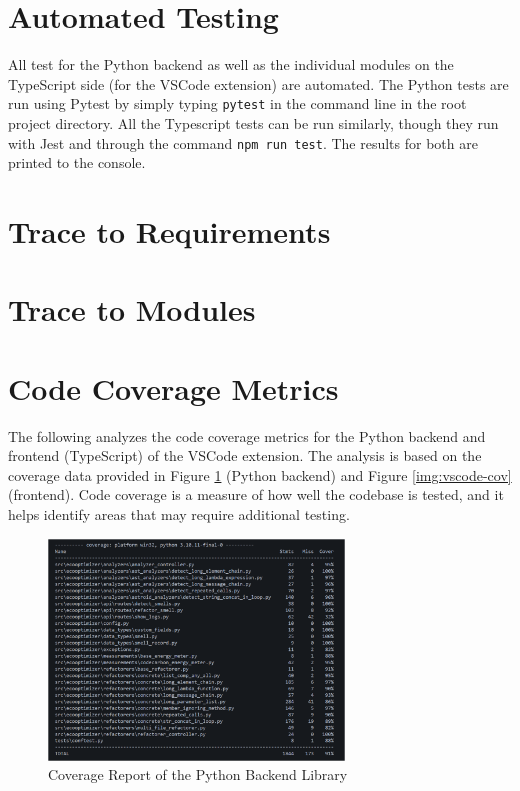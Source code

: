 \documentclass[12pt, titlepage]{article}
\begin{document}

\section{Automated Testing}

All test for the Python backend as well as the individual modules on the TypeScript side (for the VSCode extension) are automated. The Python tests are run using Pytest by simply typing \texttt{pytest} in the command line in the root project directory. All the Typescript tests can be run similarly, though they run with Jest and through the command \texttt{npm run test}. The results for both are printed to the console.
		
\section{Trace to Requirements}
		
\section{Trace to Modules}		

\section{Code Coverage Metrics}

The following analyzes the code coverage metrics for the Python backend and frontend (TypeScript) of the VSCode extension. The analysis is based on the coverage data provided in Figure \ref{img:python-cov} (Python backend) and Figure \ref{img:vscode-cov} (frontend). Code coverage is a measure of how well the codebase is tested, and it helps identify areas that may require additional testing.

\begin{figure}[H]
  \centering
  \includegraphics[width=0.7\textwidth]{../Images/python-coverage.png}
  \caption{Coverage Report of the Python Backend Library}
  \label{img:python-cov}
\end{figure}
\end{document}
